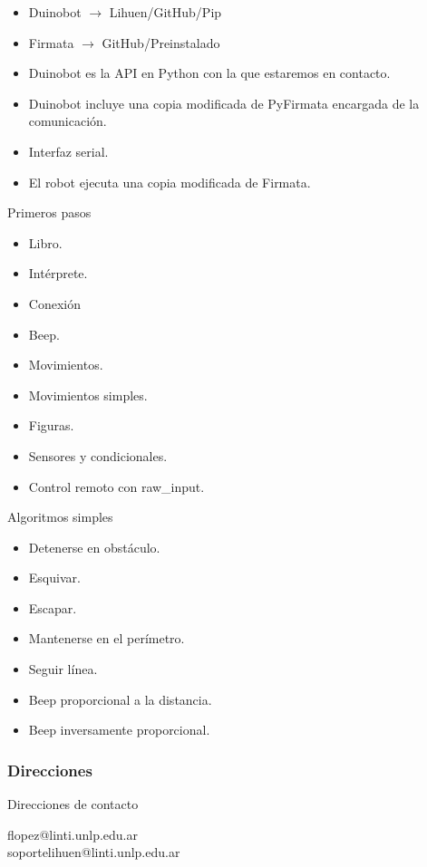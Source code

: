 \documentclass{beamer}[10]
\begin{document}
\begin{frame}
	\begin{itemize}
		\item Duinobot $\rightarrow$ Lihuen/GitHub/Pip
		\item Firmata $\rightarrow$ GitHub/Preinstalado
	\end{itemize}
	\begin{itemize}
		\item Duinobot es la API en Python con la que estaremos en contacto.
		\item Duinobot incluye una copia modificada de PyFirmata encargada de la comunicación.
		\item Interfaz serial.
		\item El robot ejecuta una copia modificada de Firmata.
	\end{itemize}
\end{frame}
\begin{frame}{Primeros pasos}
	\begin{itemize}
		\item Libro.
		\item Intérprete.
		\item Conexión
		\item Beep.
		\item Movimientos.
		\item Movimientos simples.
		\item Figuras.
		\item Sensores y condicionales.
		\item Control remoto con raw\_input.
	\end{itemize}
\end{frame}
\begin{frame}{Algoritmos simples}
	\begin{itemize}
		\item Detenerse en obstáculo.
		\item Esquivar.
		\item Escapar.
		\item Mantenerse en el perímetro.
		\item Seguir línea.
		\item Beep proporcional a la distancia.
		\item Beep inversamente proporcional.
	\end{itemize}
\end{frame}
\frame
{
\frametitle{Direcciones}

\begin{block}{Direcciones de contacto}
\begin{center}
flopez@linti.unlp.edu.ar \\
soportelihuen@linti.unlp.edu.ar
\end{center}
\end{block}

}
\end{document}
